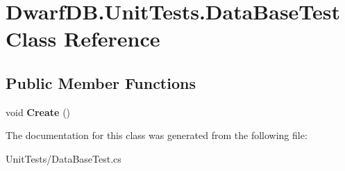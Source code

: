 \hypertarget{class_dwarf_d_b_1_1_unit_tests_1_1_data_base_test}{
\section{DwarfDB.UnitTests.DataBaseTest Class Reference}
\label{class_dwarf_d_b_1_1_unit_tests_1_1_data_base_test}
}
\subsection*{Public Member Functions}
\begin{DoxyCompactItemize}
\item 
\hypertarget{class_dwarf_d_b_1_1_unit_tests_1_1_data_base_test_afa855d00243998793f74f45a8e40a925}{
void {\bfseries Create} ()}
\label{class_dwarf_d_b_1_1_unit_tests_1_1_data_base_test_afa855d00243998793f74f45a8e40a925}

\end{DoxyCompactItemize}


The documentation for this class was generated from the following file:\begin{DoxyCompactItemize}
\item 
UnitTests/DataBaseTest.cs\end{DoxyCompactItemize}
